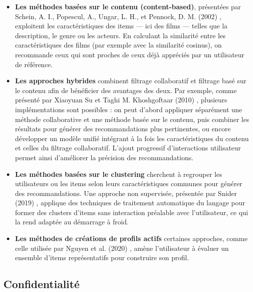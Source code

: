 \documentclass{article}
\begin{document}
\begin{itemize}
    \item \textbf{Les méthodes basées sur le contenu (content-based)}, présentées par Schein, A. I., Popescul, A., Ungar, L. H., et Pennock, D. M. (2002) \cite{schein2002_methods}, exploitent les caractéristiques des items — ici des films — 
    telles que la description, le genre ou les acteurs. En calculant la similarité entre les caractéristiques des films (par exemple avec la similarité cosinus), on recommande ceux qui sont proches de ceux déjà appréciés par un utilisateur de référence.
    \item \textbf{Les approches hybrides} combinent filtrage collaboratif et filtrage basé sur le contenu afin de bénéficier des avantages des deux. Par exemple, comme présenté par Xiaoyuan Su et Taghi M. Khoshgoftaar (2010) \cite{su_cf_survey}, 
    plusieurs implémentations sont possibles : on peut d’abord appliquer séparément une méthode collaborative et une méthode basée sur le contenu, puis combiner les résultats pour générer des recommandations plus pertinentes, ou encore développer 
    un modèle unifié intégrant à la fois les caractéristiques du contenu et celles du filtrage collaboratif. L’ajout progressif d’interactions utilisateur permet ainsi d’améliorer la précision des recommandations.
    \item \textbf{Les méthodes basées sur le clustering} cherchent à regrouper les utilisateurs ou les items selon leurs caractéristiques communes pour générer des recommandations. Une approche non supervisée, présentée par Snider 
    (2019) \cite{snider_unsupervised}, applique des techniques de traitement automatique du langage pour former des clusters d’items sans interaction préalable avec l’utilisateur, ce qui la rend adaptée au démarrage à froid.
    \item \textbf{Les méthodes de créations de profils actifs} certaines approches, comme celle utilisée par Nguyen et al. (2020) \cite{nguyen2020_active}, amène l’utilisateur à évaluer un ensemble d’items représentatifs 
    pour construire son profil.
\end{itemize}

\subsection{Confidentialité}
\end{document}
